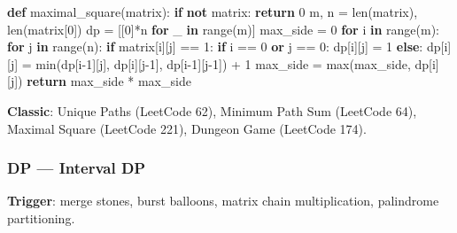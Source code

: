 \documentclass[11pt]{article}
\newenvironment{Shaded}{\begin{snugshade}}{\end{snugshade}}
\newcommand{\BuiltInTok}[1]{\textcolor[rgb]{0.50,0.55,0.55}{#1}}
\newcommand{\ControlFlowTok}[1]{\textcolor[rgb]{0.99,0.74,0.29}{\textbf{#1}}}
\newcommand{\DecValTok}[1]{\textcolor[rgb]{0.96,0.45,0.00}{#1}}
\newcommand{\KeywordTok}[1]{\textcolor[rgb]{0.81,0.81,0.76}{\textbf{#1}}}
\newcommand{\NormalTok}[1]{\textcolor[rgb]{0.81,0.81,0.76}{#1}}
\newcommand{\OperatorTok}[1]{\textcolor[rgb]{0.81,0.81,0.76}{#1}}
\newcommand{\StringTok}[1]{\textcolor[rgb]{0.96,0.31,0.31}{#1}}
\begin{document}
\begin{Shaded}
\begin{Highlighting}[]
\KeywordTok{def}\NormalTok{ maximal\_square(matrix):}
    \ControlFlowTok{if} \KeywordTok{not}\NormalTok{ matrix: }\ControlFlowTok{return} \DecValTok{0}
\NormalTok{    m, n }\OperatorTok{=} \BuiltInTok{len}\NormalTok{(matrix), }\BuiltInTok{len}\NormalTok{(matrix[}\DecValTok{0}\NormalTok{])}
\NormalTok{    dp }\OperatorTok{=}\NormalTok{ [[}\DecValTok{0}\NormalTok{]}\OperatorTok{*}\NormalTok{n }\ControlFlowTok{for}\NormalTok{ \_ }\KeywordTok{in} \BuiltInTok{range}\NormalTok{(m)]}
\NormalTok{    max\_side }\OperatorTok{=} \DecValTok{0}
    \ControlFlowTok{for}\NormalTok{ i }\KeywordTok{in} \BuiltInTok{range}\NormalTok{(m):}
        \ControlFlowTok{for}\NormalTok{ j }\KeywordTok{in} \BuiltInTok{range}\NormalTok{(n):}
            \ControlFlowTok{if}\NormalTok{ matrix[i][j] }\OperatorTok{==} \StringTok{\textquotesingle{}1\textquotesingle{}}\NormalTok{:}
                \ControlFlowTok{if}\NormalTok{ i }\OperatorTok{==} \DecValTok{0} \KeywordTok{or}\NormalTok{ j }\OperatorTok{==} \DecValTok{0}\NormalTok{:}
\NormalTok{                    dp[i][j] }\OperatorTok{=} \DecValTok{1}
                \ControlFlowTok{else}\NormalTok{:}
\NormalTok{                    dp[i][j] }\OperatorTok{=} \BuiltInTok{min}\NormalTok{(dp[i}\OperatorTok{{-}}\DecValTok{1}\NormalTok{][j], dp[i][j}\OperatorTok{{-}}\DecValTok{1}\NormalTok{], dp[i}\OperatorTok{{-}}\DecValTok{1}\NormalTok{][j}\OperatorTok{{-}}\DecValTok{1}\NormalTok{]) }\OperatorTok{+} \DecValTok{1}
\NormalTok{                max\_side }\OperatorTok{=} \BuiltInTok{max}\NormalTok{(max\_side, dp[i][j])}
    \ControlFlowTok{return}\NormalTok{ max\_side }\OperatorTok{*}\NormalTok{ max\_side}
\end{Highlighting}
\end{Shaded}

\textbf{Classic}: Unique Paths (LeetCode 62), Minimum Path Sum (LeetCode 64), Maximal Square (LeetCode 221), Dungeon Game (LeetCode 174).

\subsubsection{DP --- Interval DP}\label{dp--interval-dp}

\textbf{Trigger}: merge stones, burst balloons, matrix chain multiplication, palindrome partitioning.

\end{document}
